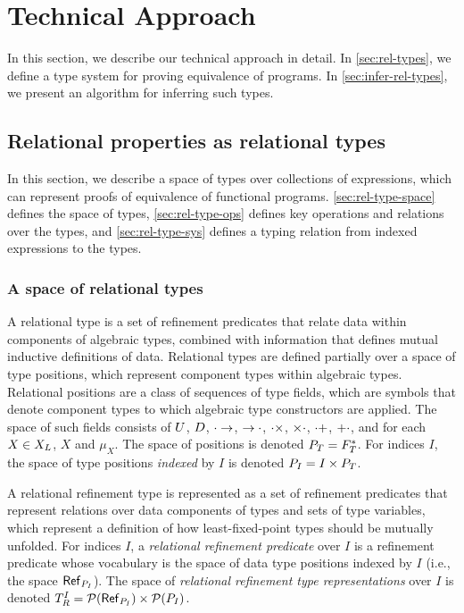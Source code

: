 \section{Technical Approach}
%
In this section, we describe our technical approach in detail.
%
In \autoref{sec:rel-types}, we define a type system for proving
equivalence of programs.
%
In \autoref{sec:infer-rel-types}, we present an algorithm for
inferring such types.

\subsection{Relational properties as relational types}
\label{sec:rel-types}
%
In this section, we describe a space of types over collections of
expressions, which can represent proofs of equivalence of functional
programs.
%
\autoref{sec:rel-type-space} defines the space of types, %
\autoref{sec:rel-type-ops} defines key operations and relations over
the types, and %
\autoref{sec:rel-type-sys} defines a typing relation from indexed
expressions to the types.

\subsubsection{A space of relational types}
\label{sec:rel-type-space}
A relational type is a set of refinement predicates that relate data
within components of algebraic types, combined with information that
defines mutual inductive definitions of data.
%
Relational types are defined partially over a space of type positions,
which represent component types within algebraic types.
%
Relational positions are a class of sequences of type fields, which
are symbols that denote component types to which algebraic type
constructors are applied.
%
The space of such fields consists of $U$, $D$,
$\cdot \to$, $\to \cdot$, $\cdot \times$, $\times \cdot$,
$\cdot +$, $+ \cdot$, and for each $X \in X_L$, $X$ and
$\mu_X$.
%
The space of positions is denoted $P_T = F_T^{*}$.
For indices $I$, the space of type positions \emph{indexed} by $I$ is
denoted $P_{I} = I \times P_T$.

A relational refinement type is represented as a set of refinement
predicates that represent relations over data components of types and
sets of type variables, which represent a definition of how
least-fixed-point types should be mutually unfolded.
%
%
For indices $I$, a \emph{relational refinement predicate} over $I$ is
a refinement predicate whose vocabulary is the space of data type
positions indexed by $I$ (i.e., the space
$\mathsf{Ref}_{ P_{I} }$).
%
The space of \emph{relational refinement type representations} over
$I$ is denoted
$T_{R}^{I} = \mathcal{P}(\mathsf{Ref}_{ P_{I} }) \times
\mathcal{P}(P_{I})$.

